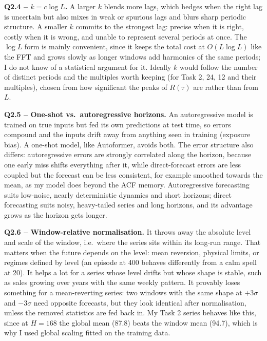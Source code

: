 \documentclass[11pt]{article}
\begin{document}
\textbf{Q2.4 -- $k = c\log L$.} A larger $k$ blends more lags, which hedges when the right lag is
uncertain but also mixes in weak or spurious lags and blurs sharp periodic structure. A smaller
$k$ commits to the strongest lag: precise when it is right, costly when it is wrong, and unable to
represent several periods at once. The $\log L$ form is mainly convenient, since it keeps the total
cost at $O(L\log L)$ like the FFT and grows slowly as longer windows add harmonics of the same
periods; I do not know of a statistical argument for it. Ideally $k$ would follow the number of
distinct periods and the multiples worth keeping (for Task 2, 24, 12 and their multiples), chosen
from how significant the peaks of $R(\tau)$ are rather than from $L$.

\textbf{Q2.5 -- One-shot vs.\ autoregressive horizons.} An autoregressive model is trained on true
inputs but fed its own predictions at test time, so errors compound and the inputs drift away from
anything seen in training (exposure bias). A one-shot model, like Autoformer, avoids both. The
error structure also differs: autoregressive errors are strongly correlated along the horizon,
because one early miss shifts everything after it, while direct-forecast errors are less coupled
but the forecast can be less consistent, for example smoothed towards the mean, as my model does
beyond the ACF memory. Autoregressive forecasting suits low-noise, nearly deterministic dynamics and
short horizons; direct forecasting suits noisy, heavy-tailed series and long horizons, and its
advantage grows as the horizon gets longer.

\textbf{Q2.6 -- Window-relative normalisation.} It throws away the absolute level and scale of the
window, i.e.\ where the series sits within its long-run range. That matters when the future depends
on the level: mean reversion, physical limits, or regimes defined by level (an episode at 400
behaves differently from a calm spell at 20). It helps a lot for a series whose level drifts but
whose shape is stable, such as sales growing over years with the same weekly pattern. It provably
loses something for a mean-reverting series: two windows with the same shape at $+3\sigma$ and
$-3\sigma$ need opposite forecasts, but they look identical after normalisation, unless the
removed statistics are fed back in. My Task 2 series behaves like this, since at $H=168$ the
global mean (87.8) beats the window mean (94.7), which is why I used global scaling fitted on the
training data.
\end{document}
